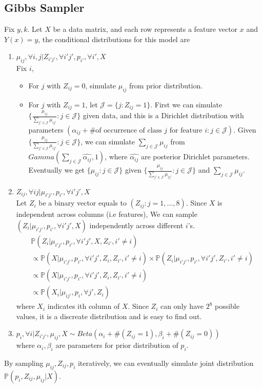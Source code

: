 \documentclass[12pt]{article}
\begin{document}
\subsection{Gibbs Sampler}
Fix $y,k$. Let $X$ be a data matrix, and each row represents a feature vector $x$ and $Y(x)=y$, the conditional distributions for this model are
\begin{enumerate}
    \item
    $\mu_{ij}, \forall i,j | Z_{i'j'}, \forall i'j', p_{i'}, \forall i', X$\\
    Fix $i$, \begin{itemize}
 \item
 For $j$ with $Z_{ij}=0$, simulate $\mu_{ij}$ from prior distribution.
 \item
 For $j$ with $Z_{ij}=1$, let $\mathcal{J}=\{j: Z_{ij}=1\}$. First we can simulate $\{\frac{\mu_{ij}}{\sum_{j' \in \mathcal{J}} \mu_{ij'}} : j \in \mathcal{J}\}$ given data, and this is a Dirichlet distribution with parameters $(\alpha_{ij}+\text{\# of occurrence of class $j$ for feature $i$} : j \in \mathcal{J})$. Given $\{\frac{\mu_{ij}}{\sum_{j' \in \mathcal{J}} \mu_{ij'}} : j \in \mathcal{J}\}$, we can simulate $\sum_{j \in \mathcal{J}} \mu_{ij}$ from $Gamma(\sum_{j \in \mathcal{J}} \hat{\alpha_{ij}},1)$, where $\hat{\alpha_{ij}}$ are posterior Dirichlet parameters. Eventually we get $\{\mu_{ij}:j \in \mathcal{J}\}$ given $\{\frac{\mu_{ij}}{\sum_{j' \in \mathcal{J}} \mu_{ij'}} : j \in \mathcal{J}\}$ and $\sum_{j \in \mathcal{J}} \mu_{ij}$. 
 \end{itemize}
    \item
    $Z_{ij}, \forall ij | \mu_{i'j'}, p_{i'}, \forall i'j', X$ \\
    Let $Z_i$ be a binary vector equals to $(Z_{ij} : j=1,\ldots, 8)$. Since $X$ is independent across columns (i.e features), We can sample $(Z_i | \mu_{i'j'}, p_{i'}, \forall i'j', X)$ independently across different $i$'s. 
    \begin{align*}
    &\mathbb{P} (Z_i | \mu_{i'j'}, p_{i'}, \forall i'j', X, Z_{i'}, i' \neq i) \\
    &\propto \mathbb{P} (X | \mu_{i'j'}, p_{i'}, \forall i'j', Z_i, Z_{i'}, i' \neq i) \times \mathbb{P} (Z_i | \mu_{i'j'}, p_{i'}, \forall i'j', Z_{i'}, i' \neq i)\\
    &\propto \mathbb{P} (X | \mu_{i'j'}, p_{i'}, \forall i'j', Z_i, Z_{i'}, i' \neq i) \\
    &\propto \mathbb{P} (X_i | \mu_{ij'}, p_{i}, \forall j', Z_i)
    \end{align*}
    where $X_i$ indicates ith column of $X$. Since $Z_i$ can only have $2^8$ possible values, it is a discreate distribution and is easy to find out.
    \item
    $p_i, \forall i | Z_{i'j'}, \mu_{ij}, X \sim Beta(\alpha_i + \# (Z_{ij}=1), \beta_i + \# (Z_{ij}=0) )$\\
    where $\alpha_i, \beta_i$ are parameters for prior distribution of $p_i$.
\end{enumerate}

By sampling $\mu_{ij}, Z_{ij}, p_i$ iteratively, we can eventually simulate joint distribution $\mathbb{P} (p_i, Z_{ij}, \mu_{ij} | X)$.
\end{document}
